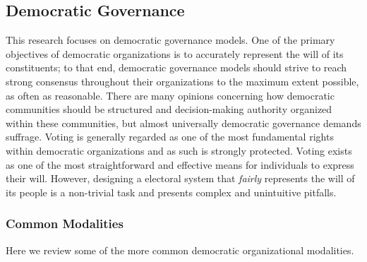 

\subsection{Democratic Governance}



This research focuses on democratic governance models. One of the primary
objectives of democratic organizations is to accurately represent the will of
its constituents; to that end, democratic governance models should strive to
reach strong consensus throughout their organizations to the maximum extent
possible, as often as reasonable. There are many opinions concerning how
democratic communities should be structured and decision-making authority
organized within these communities, but almost universally democratic governance
demands suffrage. Voting is generally regarded as one of the most fundamental
rights within democratic organizations and as such is strongly protected. Voting
exists as one of the most straightforward and effective means for individuals to
express their will. However, designing a electoral system that \emph{fairly}
represents the will of its people is a non-trivial task and presents complex and
unintuitive pitfalls.



\subsubsection{Common Modalities}

Here we review some of the more common democratic organizational modalities.


